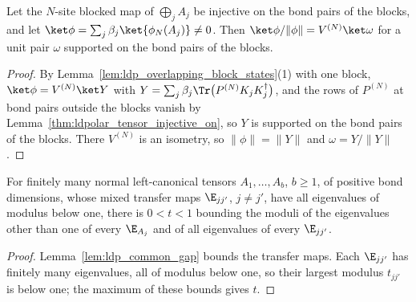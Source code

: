 \begin{lemma}
    \label{lem:ldp_overlapping_one_block_chain}
    \leanok
    Let the $N$-site blocked map of $\bigoplus_jA_j$ be injective on the bond
    pairs of the blocks, and let $\ket\phi=\sum_j\beta_j\ket{\phi_N(A_j)}\neq0$.
    Then $\ket\phi/\lVert\phi\rVert=V^{(N)}\ket\omega$ for a unit pair $\omega$
    supported on the bond pairs of the blocks.
\end{lemma}
\begin{proof}
    \leanok
    By Lemma~\ref{lem:ldp_overlapping_block_states}(1) with one block,
    $\ket\phi=V^{(N)}\ket Y$ with
    $Y=\sum_j\beta_j\Tr\bigl(P^{(N)}K_jK_j^\dagger\bigr)$, and the rows of
    $P^{(N)}$ at bond pairs outside the blocks vanish by
    Lemma~\ref{thm:ldpolar_tensor_injective_on}, so $Y$ is supported on the
    bond pairs of the blocks. There $V^{(N)}$ is an isometry, so
    $\lVert\phi\rVert=\lVert Y\rVert$ and $\omega=Y/\lVert Y\rVert$.
\end{proof}

\begin{lemma}
    \label{lem:ldp_common_mixed_gap}
    \leanok
    For finitely many normal left-canonical tensors $A_1,\dots,A_b$, $b\geq1$, of
    positive bond dimensions, whose mixed transfer maps $\E_{jj'}$, $j\neq j'$,
    have all eigenvalues of modulus below one, there is $0<t<1$ bounding the
    moduli of the eigenvalues other than one of every $\E_{A_j}$ and of all
    eigenvalues of every $\E_{jj'}$.
\end{lemma}
\begin{proof}
    \leanok
    Lemma~\ref{lem:ldp_common_gap} bounds the transfer maps. Each $\E_{jj'}$ has
    finitely many eigenvalues, all of modulus below one, so their largest
    modulus $t_{jj'}$ is below one; the maximum of these bounds gives $t$.
\end{proof}

